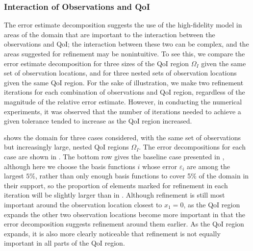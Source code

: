 \documentclass[review,sort&compress]{elsarticle}
\begin{document}
\subsubsection{Interaction of Observations and QoI} \label{sec:qoivdata}
%
The error estimate decomposition suggests the use of the high-fidelity model in areas of the domain that are important to the interaction between the observations and QoI; the interaction between these two can be complex, and the areas suggested for refinement may be nonintuitive. To see this, we compare the error estimate decomposition for three sizes of the QoI region $\Omega_I$ given the same set of observation locations, and for three nested sets of observation locations given the same QoI region. For the sake of illustration, we make two refinement iterations for each combination of observations and QoI region, regardless of the magnitude of the relative error estimate. However, in conducting the numerical experiments, it was observed that the number of iterations needed to achieve a given tolerance tended to increase as the QoI region increased.

 shows the domain for three cases considered, with the same set of observations but increasingly large, nested QoI regions $\Omega_I$.
The error decompositions for each case are shown in . The bottom row gives the baseline case presented in , although here we choose the basis functions $i$ whose error $\varepsilon_i$ are among the largest $5\%$, rather than only enough basis functions to cover 5\% of the domain in their support, so the proportion of elements marked for refinement in each iteration will be slightly larger than in . Although refinement is still most important around the observation location closest to $x_1=0$, as the QoI region expands the other two observation locations become more important in that the error decomposition suggests refinement around them earlier. As the QoI region expands, it is also more clearly noticeable that refinement is not equally important in all parts of the QoI region.
\end{document}
